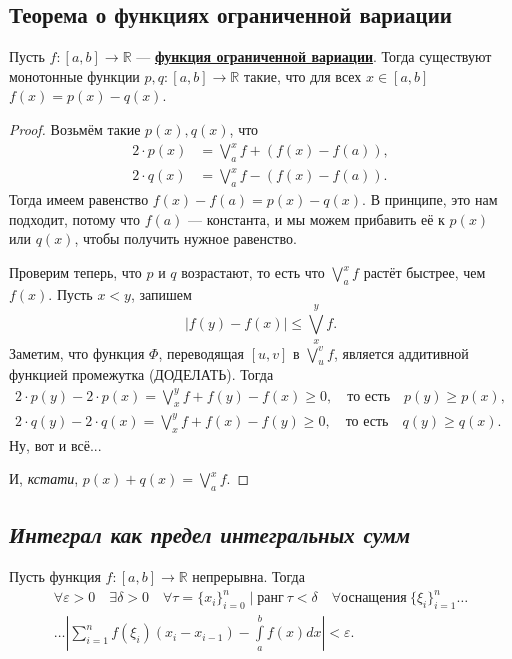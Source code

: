 \subsection{Теорема о функциях ограниченной вариации}

\begin{theorem}
	Пусть \(f\colon [a, b] \to \mathbb{R}\) --- \hyperlink{orgvar}{\bfseries функция ограниченной вариации}. Тогда существуют монотонные функции \(p, q\colon [a, b] \to \mathbb{R}\) такие, что для всех \(x \in [a, b]\) \(f(x) = p(x) - q(x)\).
\end{theorem}
\begin{proof}
	Возьмём такие \(p(x), q(x)\), что
	\begin{align*}
		2 \cdot p(x) &= \bigvee_a^x f + (f(x) - f(a)), \\
		2 \cdot q(x) &= \bigvee_a^x f - (f(x) - f(a)).
	\end{align*}
	Тогда имеем равенство \(f(x) - f(a) = p(x) - q(x)\). В принципе, это нам подходит, потому что \(f(a)\) --- константа, и мы можем прибавить её к \(p(x)\) или \(q(x)\), чтобы получить нужное равенство.
	
	Проверим теперь, что \(p\) и \(q\) возрастают, то есть что \(\bigvee_a^x f\) растёт быстрее, чем \(f(x)\). Пусть \(x < y\), запишем \[
		|f(y) - f(x)| \leqslant \bigvee_x^y f.
	\]
	Заметим, что функция \(\Phi\), переводящая \([u, v]\) в \(\bigvee_u^v f\), является аддитивной функцией промежутка (ДОДЕЛАТЬ). Тогда
	\begin{gather*}
		2 \cdot p(y) - 2 \cdot p(x) = \bigvee_x^y f + f(y) - f(x) \geqslant 0, \quad \text{то есть} \quad p(y) \geqslant p(x), \\
		2 \cdot q(y) - 2 \cdot q(x) = \bigvee_x^y f + f(x) - f(y) \geqslant 0, \quad \text{то есть} \quad q(y) \geqslant q(x).
	\end{gather*}
	Ну, вот и всё...
	
	И, \textit{кстати}, \(p(x) + q(x) = \bigvee_a^x f\).
\end{proof}

\subsection{\itshape Интеграл как предел интегральных сумм}

\begin{theorem}
	Пусть функция \(f \colon [a, b] \to \mathbb{R}\) непрерывна. Тогда
	\begin{gather*}
		\forall \varepsilon > 0 \quad \exists \delta > 0 \quad \forall \tau = \{x_i\}_{i = 0}^n \mid \text{ранг} \ \tau < \delta \quad \forall \text{оснащения} \ \{\xi_i\}_{i = 1}^n \ldots \\
		\ldots \left|\sum_{i = 1}^n f(\xi_i) (x_i - x_{i - 1}) - \int\limits_a^b f(x) dx \right| < \varepsilon.
	\end{gather*}
\end{theorem}

